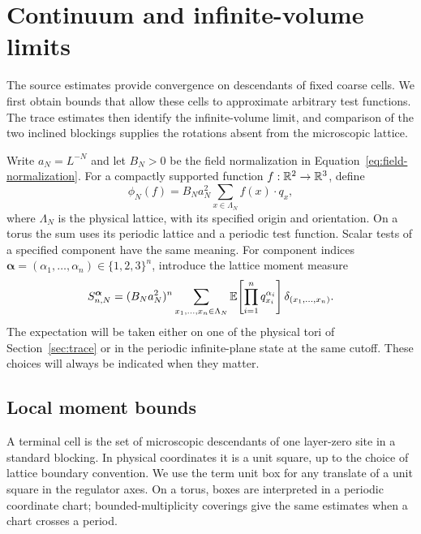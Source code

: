 \section{Continuum and infinite-volume limits}
\label{sec:continuum}

The source estimates provide convergence on descendants of fixed coarse
cells.  We first obtain bounds that allow these cells to approximate
arbitrary test functions.  The trace estimates then identify the
infinite-volume limit, and comparison of the two inclined blockings
supplies the rotations absent from the microscopic lattice.

Write $a_N=L^{-N}$ and let $B_N>0$ be the field normalization in
Equation~\eqref{eq:field-normalization}.  For a compactly supported
function $f:\mathbb R^2\to\mathbb R^3$, define
\begin{equation}
 \phi_N(f)=B_Na_N^2\sum_{x\in\Lambda_N}
                  f(x)\cdot q_x,
 \label{eq:smeared-lattice-field}
\end{equation}
where $\Lambda_N$ is the physical lattice, with its specified origin and
orientation.  On a torus the sum uses its periodic lattice and a periodic
test function.  Scalar tests of a specified component have the same
meaning.  For component indices
$\boldsymbol\alpha=(\alpha_1,\ldots,\alpha_n)\in\{1,2,3\}^n$, introduce
the lattice moment measure
\begin{equation}
 S_{n,N}^{\boldsymbol\alpha}
   =(B_Na_N^2)^n\sum_{x_1,\ldots,x_n\in\Lambda_N}
       \mathbb E\!\left[\prod_{i=1}^n q_{x_i}^{\alpha_i}\right]
       \delta_{(x_1,\ldots,x_n)}.
 \label{eq:lattice-moment-measure}
\end{equation}
The expectation will be taken either on one of the physical tori of
Section~\ref{sec:trace} or in the periodic infinite-plane state at the
same cutoff.  These choices will always be indicated when they matter.

\subsection{Local moment bounds}

A terminal cell is the set of microscopic descendants of one layer-zero
site in a standard blocking.  In physical coordinates it is a unit
square, up to the choice of lattice boundary convention.  We use the
term unit box for any translate of a unit square in the regulator axes.
On a torus, boxes are interpreted in a periodic coordinate chart;
bounded-multiplicity coverings give the same estimates when a chart
crosses a period.


